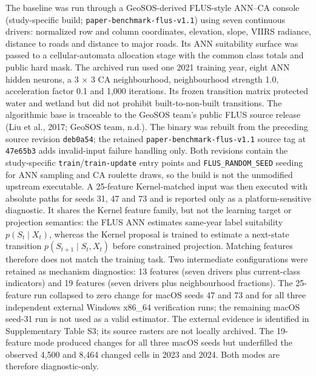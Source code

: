 The baseline was run through a GeoSOS-derived FLUS-style ANN--CA console
(study-specific build; \texttt{paper-benchmark-flus-v1.1}) using seven
continuous drivers: normalized row and column coordinates, elevation,
slope, VIIRS radiance, distance to roads and distance to major roads.
Its ANN suitability surface was passed to a cellular-automata allocation
stage with the common class totals and public hard mask. The archived
run used one 2021 training year, eight ANN hidden neurons, a 3 × 3 CA
neighbourhood, neighbourhood strength 1.0, acceleration factor 0.1 and
1,000 iterations. Its frozen transition matrix protected water and
wetland but did not prohibit built-to-non-built transitions. The
algorithmic base is traceable to the GeoSOS team's public FLUS source
release (Liu et al., 2017; GeoSOS team, n.d.). The binary was rebuilt
from the preceding source revision \texttt{deb0a54}; the retained
\texttt{paper-benchmark-flus-v1.1} source tag at \texttt{47e65b3} adds
invalid-input failure handling only. Both revisions contain the
study-specific \texttt{train}/\texttt{train-update} entry points and
\texttt{FLUS\_RANDOM\_SEED} seeding for ANN sampling and CA roulette
draws, so the build is not the unmodified upstream executable. A
25-feature Kernel-matched input was then executed with absolute paths
for seeds 31, 47 and 73 and is reported only as a platform-sensitive
diagnostic. It shares the Kernel feature family, but not the learning
target or projection semantics: the FLUS ANN estimates same-year label
suitability \(p(S_t\mid X_t)\), whereas the Kernel proposal is trained
to estimate a next-state transition \(p(S_{t+1}\mid S_t,X_t)\) before
constrained projection. Matching features therefore does not match the
training task. Two intermediate configurations were retained as
mechanism diagnostics: 13 features (seven drivers plus current-class
indicators) and 19 features (seven drivers plus neighbourhood
fractions). The 25-feature run collapsed to zero change for macOS seeds
47 and 73 and for all three independent external Windows x86\_64
verification runs; the remaining macOS seed-31 run is not used as a
valid estimator. The external evidence is identified in Supplementary
Table S3; its source rasters are not locally archived. The 19-feature
mode produced changes for all three macOS seeds but underfilled the
observed 4,500 and 8,464 changed cells in 2023 and 2024. Both modes are
therefore diagnostic-only.

